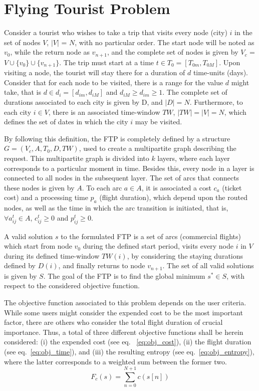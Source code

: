 

\section{Flying Tourist Problem}
\label{sec:ftp}


Consider a tourist who wishes to take a trip that visits every node (city) $i$
in the set of nodes $V$, $|V|$ = $N$, with no particular order. The start node
will be noted as $v_{0}$, while the return node as $v_{n+1}$, and the complete
set of nodes is given by $V_c$ = $V \cup \{v_0\} \cup \{v_{n+1}\}$. The trip
must start at a time $t \in T_0 = [T_{0m}, T_{0M}]$. Upon visiting a node, the
tourist will stay there for a duration of $d$ time-units (days). Consider that
for each node to be visited, there is a range for the value $d$ might take, that
is $d \in d_i = [d_{im}, d_{iM}]$ and $d_{iM} \geq d_{im} \geq 1$. The complete
set of durations associated to each city is given by D, and $|D| = N$.
Furthermore, to each city $i \in V$, there is an associated time-window $TW$,
$|TW| = |V| = N$, which defines the set of dates in which the city $i$ may be
visited.

By following this definition, the FTP is completely defined by a structure $G =
(V_c, A, T_{0}, D, TW)$, used to create a multipartite graph describing the
request. This multipartite graph is divided into $k$ layers, where each layer
corresponds to a particular moment in time. Besides this, every node in a layer
is connected to all nodes in the subsequent layer. The set of arcs that connects
these nodes is given by $A$. To each arc $a \in A$, it is associated a cost
$c_{a}$ (ticket cost) and a processing time $p_{a}$ (flight duration), which
depend upon the routed nodes, as well as the time in which the arc transition is
initiated, that is, $\forall a_{ij}^{t} \in A$, $c_{ij}^{t} \geq 0$ and
$p_{ij}^{t} \geq 0$.

A valid solution $s$ to the formulated FTP is a set of arcs (commercial flights)
which start from node $v_0$ during the defined start period, visits every node
$i$ in $V$ during its defined time-window $TW(i)$, by considering the staying
durations defined by $D(i)$, and finally returns to node $v_{n+1}$. The set of
all valid solutions is given by $S$. The goal of the FTP is to find the global
minimum $s^* \in S$, with respect to the considered objective function.

The objective function associated to this problem depends on the user criteria.
While some users might consider the expended cost to be the most important
factor, there are others who consider the total flight duration of crucial
importance. Thus, a total of three different objective functions shall be herein
considered: (i) the expended cost (see eq. ~\ref{eq:obj_cost}), (ii) the flight
duration (see eq.~\ref{eq:obj_time}), and (iii) the resulting entropy (see
eq.~\ref{eq:obj_entropy}), where the latter corresponds to a weighted sum
between the former two. 
\begin{equation}
\label{eq:obj_cost}
  F_{c}(s) = \sum_{n=0}^{N+1} c(s[n])
\end{equation}

